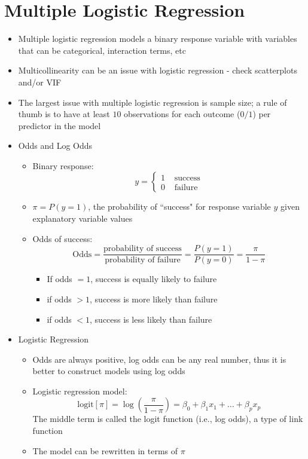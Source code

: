 \documentclass[12pt]{article}
\begin{document}
\section{Multiple Logistic Regression}
\begin{itemize}
\item Multiple logistic regression models a binary response variable with variables that can be categorical, interaction terms, etc 
\item Multicollinearity can be an issue with logistic regression - check scatterplots and/or VIF 
\item The largest issue with multiple logistic regression is sample size; a rule of thumb is to have at least $10$ observations for each outcome ($0/1$) per predictor in the model
\item Odds and Log Odds \begin{itemize} 
\item Binary response: $$ y = \begin{cases} 1 & \text{ success} \\ 0 &\text{ failure} \end{cases} $$ 
\item $\pi = P(y=1)$, the probability of ``success" for response variable $y$ given explanatory variable values
\item Odds of success: $$ \text{Odds} = \frac{\text{probability of success}}{\text{probability of failure}} = \frac{P(y=1)}{P(y=0)} = \frac{\pi}{1-\pi} $$ \begin{itemize} 
\item If odds $=1$, success is equally likely to failure
\item if odds $>1$, success is more likely than failure
\item if odds $<1$, success is less likely than failure \end{itemize} \end{itemize} 
\item Logistic Regression \begin{itemize}
\item Odds are always positive, log odds can be any real number, thus it is better to construct models using log odds 
\item Logistic regression model: $$ \text{logit}[\pi] = \log \left( \frac{\pi}{1-\pi} \right) = \beta_0 + \beta_1x_1 + \dots + \beta_px_p $$ 
The middle term is called the logit function (i.e., log odds), a type of link function 
\item The model can be rewritten in terms of $\pi$ 

\end{itemize}
\end{itemize}
\end{document}
